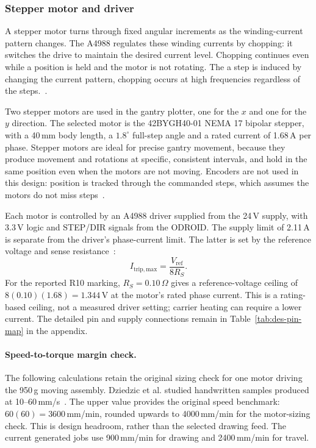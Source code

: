 \subsubsection{Stepper motor and driver}
\label{sec:des-stepper}
A stepper motor turns through fixed angular increments as the winding-current pattern changes. The A4988 regulates these winding currents by chopping: it switches the drive to maintain the desired current level. Chopping continues even while a position is held and the motor is not rotating. The a step is induced by changing the current pattern, chopping occurs at high frequencies regardless of the steps.~\cite[p.~9]{a4988ds}.

Two stepper motors are used in the gantry plotter, one for the $x$ and one for the $y$ direction. The selected motor is the 42BYGH40-01 NEMA 17 bipolar stepper, with a 40\,mm body length, a $1.8^\circ$ full-step angle and a rated current of 1.68\,A per phase. Stepper motors are ideal for precise gantry movement, because they produce movement and rotations at specific, consistent intervals, and hold in the same position even when the motors are not moving. Encoders are not used in this design: position is tracked through the commanded steps, which assumes the motors do not miss steps~\cite{acarnley2002}.

\label{sec:des-power}
Each motor is controlled by an A4988 driver supplied from the 24\,V supply, with 3.3\,V logic and STEP/DIR signals from the ODROID. The supply limit of 2.11\,A is separate from the driver's phase-current limit. The latter is set by the reference voltage and sense resistance~\cite[p.~9]{a4988ds}:
\begin{equation}
I_{\mathrm{trip,max}}=\frac{V_{\mathrm{ref}}}{8R_S}.
\label{eq:des-current}
\end{equation}
For the reported R10 marking, $R_S=0.10\,\Omega$ gives a reference-voltage ceiling of $8(0.10)(1.68)=1.344$\,V at the motor's rated phase current. This is a rating-based ceiling, not a measured driver setting; carrier heating can require a lower current. The detailed pin and supply connections remain in Table~\ref{tab:des-pin-map} in the appendix.

\paragraph{Speed-to-torque margin check.}
The following calculations retain the original sizing check for one motor driving the 950\,g moving assembly. Dziedzic et al. studied handwritten samples produced at 10--60\,mm/s~\cite{dziedzic2026}. The upper value provides the original speed benchmark: $60(60)=3600$\,mm/min, rounded upwards to 4000\,mm/min for the motor-sizing check. This is design headroom, rather than the selected drawing feed. The current generated jobs use 900\,mm/min for drawing and 2400\,mm/min for travel.

